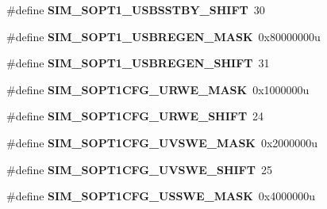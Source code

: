\begin{DoxyCompactItemize}
\item 
\hypertarget{group___s_i_m___register___masks_ga8a24334d1be5bd01017bd364dd53f268}{}\#define {\bfseries S\+I\+M\+\_\+\+S\+O\+P\+T1\+\_\+\+U\+S\+B\+S\+S\+T\+B\+Y\+\_\+\+S\+H\+I\+F\+T}~30\label{group___s_i_m___register___masks_ga8a24334d1be5bd01017bd364dd53f268}

\item 
\hypertarget{group___s_i_m___register___masks_gac60c367119b3dcc752c4cf857b8a59b5}{}\#define {\bfseries S\+I\+M\+\_\+\+S\+O\+P\+T1\+\_\+\+U\+S\+B\+R\+E\+G\+E\+N\+\_\+\+M\+A\+S\+K}~0x80000000u\label{group___s_i_m___register___masks_gac60c367119b3dcc752c4cf857b8a59b5}

\item 
\hypertarget{group___s_i_m___register___masks_ga99e46c34c02e39338c9b80775bad09db}{}\#define {\bfseries S\+I\+M\+\_\+\+S\+O\+P\+T1\+\_\+\+U\+S\+B\+R\+E\+G\+E\+N\+\_\+\+S\+H\+I\+F\+T}~31\label{group___s_i_m___register___masks_ga99e46c34c02e39338c9b80775bad09db}

\item 
\hypertarget{group___s_i_m___register___masks_gaa4e1ee8f60c8c15ad553c2dfb82c2039}{}\#define {\bfseries S\+I\+M\+\_\+\+S\+O\+P\+T1\+C\+F\+G\+\_\+\+U\+R\+W\+E\+\_\+\+M\+A\+S\+K}~0x1000000u\label{group___s_i_m___register___masks_gaa4e1ee8f60c8c15ad553c2dfb82c2039}

\item 
\hypertarget{group___s_i_m___register___masks_ga07bf2ffc61aacca96748747fa8df7062}{}\#define {\bfseries S\+I\+M\+\_\+\+S\+O\+P\+T1\+C\+F\+G\+\_\+\+U\+R\+W\+E\+\_\+\+S\+H\+I\+F\+T}~24\label{group___s_i_m___register___masks_ga07bf2ffc61aacca96748747fa8df7062}

\item 
\hypertarget{group___s_i_m___register___masks_ga29e593e134a31bed2dbd3673c51cb330}{}\#define {\bfseries S\+I\+M\+\_\+\+S\+O\+P\+T1\+C\+F\+G\+\_\+\+U\+V\+S\+W\+E\+\_\+\+M\+A\+S\+K}~0x2000000u\label{group___s_i_m___register___masks_ga29e593e134a31bed2dbd3673c51cb330}

\item 
\hypertarget{group___s_i_m___register___masks_ga74d94a9794e03091f54b76a5c18c58b8}{}\#define {\bfseries S\+I\+M\+\_\+\+S\+O\+P\+T1\+C\+F\+G\+\_\+\+U\+V\+S\+W\+E\+\_\+\+S\+H\+I\+F\+T}~25\label{group___s_i_m___register___masks_ga74d94a9794e03091f54b76a5c18c58b8}

\item 
\hypertarget{group___s_i_m___register___masks_ga0b7d9fe471d5d689ba3feb001cf69b60}{}\#define {\bfseries S\+I\+M\+\_\+\+S\+O\+P\+T1\+C\+F\+G\+\_\+\+U\+S\+S\+W\+E\+\_\+\+M\+A\+S\+K}~0x4000000u\label{group___s_i_m___register___masks_ga0b7d9fe471d5d689ba3feb001cf69b60}


\end{DoxyCompactItemize}
